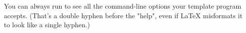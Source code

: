 You can always run  to see all the command-line
options your template program accepts.  (That's a double hyphen before the "help",
even if LaTeX misformats it to look like a single hyphen.)



